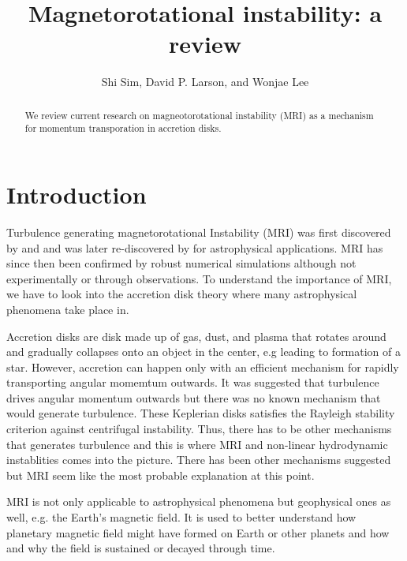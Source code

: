 \documentclass{jfm}
\title[Magnetorotational instability]{Magnetorotational instability: a review}
\author[S. Sim, D.~P. Larson, and W. Lee]{Shi Sim, David P. Larson, 
    and Wonjae Lee}
\affiliation{University of California, San Diego}
\begin{document}
\maketitle


\begin{abstract}
We review current research on magneotorotational instability (MRI) as a 
mechanism for momentum transporation in accretion disks.
\end{abstract}


\section{Introduction}
\label{sec:intro}
Turbulence generating magnetorotational Instability (MRI) was first discovered 
by \cite{Velikhov1959} and \cite{Chandrasekhar1960} and was later re-discovered by 
\cite{Balbus1998} for astrophysical applications. MRI has since then 
been confirmed by robust numerical simulations although not experimentally or
through observations. To understand the importance of MRI, we have to look into
the accretion disk theory where many astrophysical phenomena take place in.

Accretion disks are disk made up of gas, dust, and plasma that rotates around 
and gradually collapses onto an object in the center, e.g leading to formation
of a star. However, accretion can happen only with an efficient mechanism for 
rapidly transporting angular momemtum outwards. It was suggested that 
turbulence drives angular momentum outwards but there was no known mechanism 
that would generate turbulence. These Keplerian disks satisfies the Rayleigh 
stability criterion \citep[see][]{Rayleigh1916} against centrifugal instability.
Thus, there has to be other mechanisms that generates turbulence and this is where 
MRI and non-linear hydrodynamic instablities comes into the picture. There has
been other mechanisms suggested but MRI seem like the most probable explanation
at this point.

MRI is not only applicable to astrophysical phenomena but geophysical ones as 
well, e.g. the Earth's magnetic field. It is used to better understand how planetary
magnetic field might  have formed on Earth or other planets and how and why the
field is sustained or decayed through time.
\end{document}
